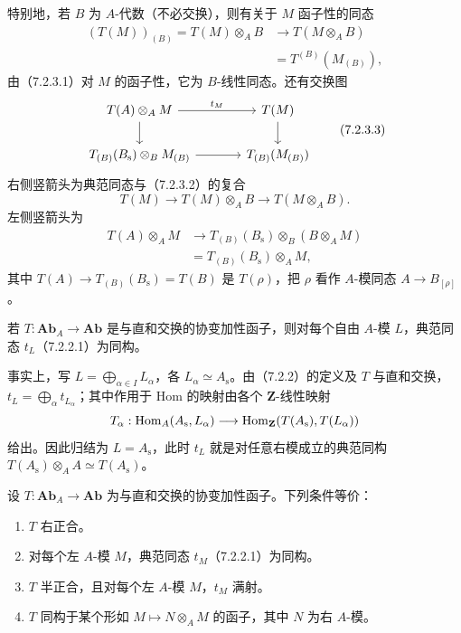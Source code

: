 特别地，若 $B$ 为 $A$-代数（不必交换），则有关于 $M$ 函子性的同态
\begin{equation}
 \begin{aligned}
 (T(M))_{(B)}=T(M)\otimes_A B
 &\longrightarrow T(M\otimes_A B)\\
 &=T^{(B)}(M_{(B)}),
 \end{aligned}\tag{7.2.3.2}
\end{equation}
由（7.2.3.1）对 $M$ 的函子性，它为 $B$-线性同态。还有交换图
\begin{equation}
 \begin{tikzcd}[column sep=large]
 T(A)\otimes_A M\arrow[r,"t_M"]\arrow[d]&T(M)\arrow[d]\\
 T_{(B)}(B_{\mathrm s})\otimes_B M_{(B)}\arrow[r]&T_{(B)}(M_{(B)})
 \end{tikzcd}\tag{7.2.3.3}
\end{equation}
右侧竖箭头为典范同态与（7.2.3.2）的复合
\[
 T(M)\longrightarrow T(M)\otimes_A B\longrightarrow
 T(M\otimes_A B).
\]
左侧竖箭头为
\[
 \begin{aligned}
 T(A)\otimes_A M&\longrightarrow
 T_{(B)}(B_{\mathrm s})\otimes_B(B\otimes_A M)\\
 &=T_{(B)}(B_{\mathrm s})\otimes_A M,
 \end{aligned}
\]
其中 $T(A)\to T_{(B)}(B_{\mathrm s})=T(B)$ 是 $T(\rho)$，把 $\rho$ 看作 $A$-模同态 $A\to B_{[\rho]}$。

若 $T:\mathbf{Ab}_A\to\mathbf{Ab}$ 是与直和交换的协变加性函子，则对每个自由 $A$-模 $L$，典范同态 $t_L$（7.2.2.1）为同构。

事实上，写 $L=\bigoplus_{\alpha\in I}L_\alpha$，各 $L_\alpha\simeq A_{\mathrm s}$。由（7.2.2）的定义及 $T$ 与直和交换，$t_L=\bigoplus_\alpha t_{L_\alpha}$；其中作用于 Hom 的映射由各个 $\mathbf Z$-线性映射
\[
 T_\alpha:\operatorname{Hom}_A(A_{\mathrm s},L_\alpha)\longrightarrow
 \operatorname{Hom}_{\mathbf Z}(T(A_{\mathrm s}),T(L_\alpha))
\]
给出。因此归结为 $L=A_{\mathrm s}$，此时 $t_L$ 就是对任意右模成立的典范同构 $T(A_{\mathrm s})\otimes_A A\simeq T(A_{\mathrm s})$。

设 $T:\mathbf{Ab}_A\to\mathbf{Ab}$ 为与直和交换的协变加性函子。下列条件等价：
\begin{enumerate}[label=\alph*)]
\item $T$ 右正合。
\item 对每个左 $A$-模 $M$，典范同态 $t_M$（7.2.2.1）为同构。
\item[\textup{b')}] $T$ 半正合，且对每个左 $A$-模 $M$，$t_M$ 满射。
\item[\textup{c)}] $T$ 同构于某个形如 $M\mapsto N\otimes_A M$ 的函子，其中 $N$ 为右 $A$-模。
\end{enumerate}

